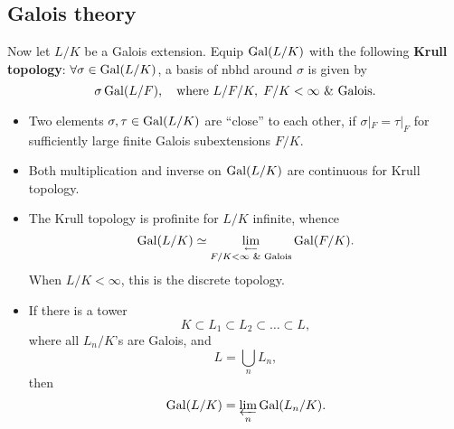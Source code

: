 

\subsection{Galois theory}
Now let $L/K$ be a Galois extension. Equip $\operatorname{Gal}(L/K)$ with the following \textbf{Krull topology}: $\forall\sigma\in\operatorname{Gal}(L/K)$, a basis of nbhd around $\sigma$ is given by\[\sigma\operatorname{Gal}(L/F),\quad\text{where } L/F/K,\; F/K < \infty\text{ \& Galois}.\]
\begin{itemize}
    \item Two elements $\sigma, \tau\in\operatorname{Gal}(L/K)$ are ``close'' to each other, if $\sigma|_F = \tau|_F$ for sufficiently large finite Galois subextensions $F/K$.
    \item Both multiplication and inverse on $\operatorname{Gal}(L/K)$ are continuous for Krull topology.
    \item The Krull topology is profinite for $L/K$ infinite, whence \[\operatorname{Gal}(L/K) \simeq \lim_{\stackrel{\longleftarrow}{F/K < \infty\text{ \& Galois}}}\operatorname{Gal}(F/K). \]
    When $L/K < \infty$, this is the discrete topology.
    \item If there is a tower \[K\subset L_1\subset L_2\subset\dots\subset L,\] where all $L_n/K$'s are Galois, and \[L = \bigcup_{n} L_n,\]
    then \[\operatorname{Gal}(L/K) = \varprojlim_n\operatorname{Gal}(L_n/K).\]

\end{itemize}

